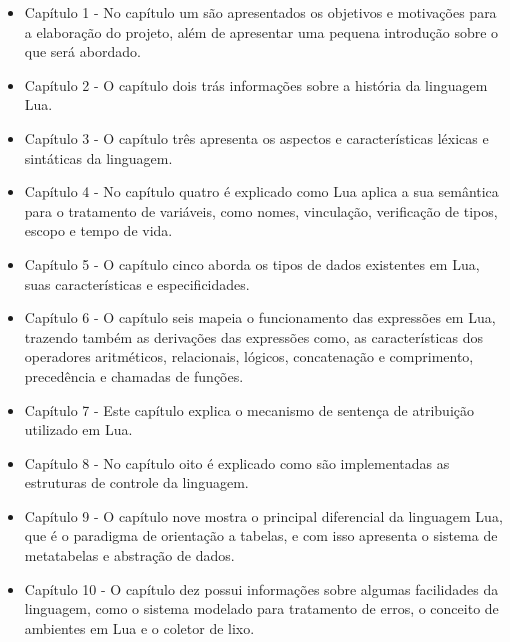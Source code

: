 \documentclass[
12pt, %
openright, %
oneside, %
a4paper, %
english, %
brazil, %
]{abntex2}
\begin{document}
\begin{itemize}

\item Capítulo 1 - No capítulo um são apresentados os objetivos e motivações para a elaboração do projeto, além de apresentar uma pequena introdução sobre o que será abordado.

\item Capítulo 2 - O capítulo dois trás informações sobre a história da linguagem Lua.

\item Capítulo 3 - O capítulo três apresenta os aspectos e características léxicas e sintáticas da linguagem.

\item Capítulo 4 - No capítulo quatro é explicado como Lua aplica a sua semântica para o tratamento de variáveis, como nomes, vinculação, verificação de tipos, escopo e tempo de vida.

\item Capítulo 5 - O capítulo cinco aborda os tipos de dados existentes em Lua, suas características e especificidades.

\item Capítulo 6 - O capítulo seis mapeia o funcionamento das expressões em Lua, trazendo também as derivações das expressões como, as características dos operadores aritméticos, relacionais, lógicos, concatenação e comprimento, precedência e chamadas de funções.

\item Capítulo 7 - Este capítulo explica o mecanismo de sentença de atribuição utilizado em Lua.

\item Capítulo 8 - No capítulo oito é explicado como são implementadas as estruturas de controle da linguagem. 

\item Capítulo 9 - O capítulo nove mostra o principal diferencial da linguagem Lua, que é o paradigma de orientação a tabelas, e com isso apresenta o sistema de metatabelas e abstração de dados.

\item Capítulo 10 - O capítulo dez possui informações sobre algumas facilidades da linguagem, como o sistema modelado para tratamento de erros, o conceito de ambientes em Lua e o coletor de lixo.

\end{itemize}


\end{document}

